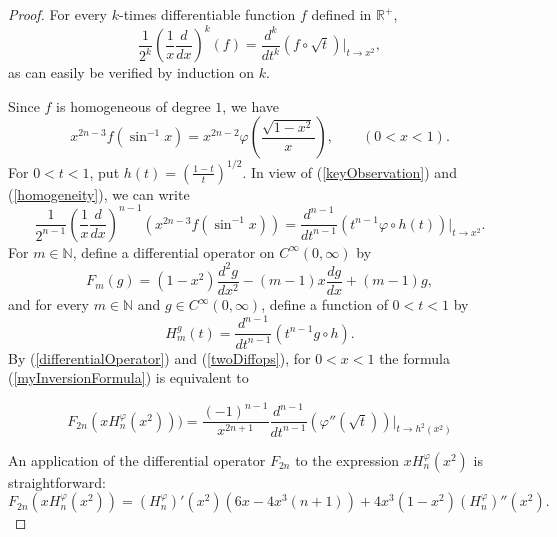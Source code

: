 \documentclass{article}[1100]
\theoremstyle{definition}
\theoremstyle{remark}
\newcommand\ar{\mathbb{R}}
\newcommand\inverseRadonPart[2]{\left(\frac{1}{{#1}}\frac{d}{d{#1}}\right)^{#2}}
\newcommand\smallcirc{\scriptstyle\circ}
\begin{document}
\begin{proof} 

For every $k$-times differentiable function $f$ defined in $\ar^+$,
\begin{equation}\label{keyObservation}
\frac{1}{2^k}\left(\frac{1}{x}\frac{d}{dx}\right)^k(f)=\frac{d^k}{dt^k}(f{\smallcirc}\sqrt{t})\Big|_{t\to x^2},
\end{equation}
as can easily be verified by induction on $k$.

\medskip

Since $f$ is homogeneous of degree $1$,  we have 
\begin{equation}\label{homogeneity}
 x^{2n-3}f(\sin^{-1}x)=x^{2n-2}\varphi(\frac{\sqrt{1-x^2}}{x}),\qquad (0<x <1).
 \end{equation}
For $0<t<1$, put  $h(t)=(\frac{1-t}{t})^{1/2}$. In view of (\ref{keyObservation}) and (\ref{homogeneity}), we can write
\begin{equation}\label{twoDiffops}
\frac{1}{2^{n-1}}\inverseRadonPart{x}{n-1}(x^{2n-3}f(\sin^{-1} x)) = \frac{d^{n-1}}{dt^{n-1}}(t^{n-1}\varphi{\smallcirc} h(t))\Big|_{t\to x^2}.
\end{equation}
For $m\in\mathbb{N}$, define a differential operator on $C^{\infty}(0,\infty)$ by
\[ F_m(g)=(1-x^2)\frac{d^2g}{dx^2}-(m-1)x\frac{dg}{dx}+(m-1)g,\]
and for every $m\in\mathbb{N}$ and $g\in C^{\infty}(0,\infty)$, define a function of $0<t<1$ by
\[ H_m^g(t)=\frac{d^{n-1}}{dt^{n-1}}(t^{n-1}g{\smallcirc} h). \]
By (\ref{differentialOperator}) and (\ref{twoDiffops}),  for $0<x<1$ the formula (\ref{myInversionFormula})  is 
equivalent to 

\begin{equation}\label{eq1}F_{2n}(x H_n^{\varphi}(x^2)))=
\frac{(-1)^{n-1}}{x^{2n+1}}
\frac{d^{n-1}}{dt^{n-1}}
(\varphi''(\sqrt{t}))\Big|_{t\to h^2(x^2)}
\end{equation}

\medskip

An application of the differential operator $F_{2n}$ to the expression $xH_n^{\varphi}(x^2)$ is straightforward:
\begin{equation}\label{eq2}
F_{2n}(xH_n^\varphi(x^2))=(H_n^\varphi)'(x^2)(6x-4x^3(n+1))+4x^3(1-x^2)(H_n^\varphi)''(x^2).
\end{equation}


\end{proof}
\end{document}
